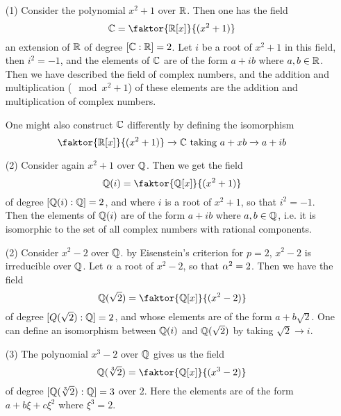 \begin{example}\label{example_8.3}
  \begin{enumerate}
    \item[(1)] Consider the polynomial $x^2+1$ over $\mathbb{R}$. Then one has the
      field
      \begin{equation*}
        \C=\faktor{\R[x]}{(x^2+1)}
      \end{equation*}
      an extension of $\mathbb{R}$ of degree $[\mathbb{C} : \mathbb{R}]=2$. Let $i$ be a root of
      $x^2+1$ in this field, then $i^2=-1$, and the elements of $\mathbb{C}$ are of
      the form $a+ib$ where  $a,b \in \mathbb{R}$. Then we have described the
      field of complex numbers, and the addition and multiplication
      ($\mod{x^2+1}$) of these elements are the addition and
      multiplication of complex numbers.

      One might also construct $\mathbb{C}$ differently by defining the
      isomorphism
      \begin{equation*}
        \faktor{\R[x]}{(x^2+1)} \xrightarrow{} \C \text{ taking }
        a+xb    \xrightarrow{} a+ib
      \end{equation*}

    \item[(2)] Consider again $x^2+1$ over  $\mathbb{Q}$. Then we get the field
      \begin{equation*}
        \Q(i)=\faktor{\Q[x]}{(x^2+1)}
      \end{equation*}
      of degree $[\mathbb{Q}(i):\mathbb{Q}]=2$, and where $i$ is a root of  $x^2+1$, so
      that  $i^2=-1$. Then the elements of  $\mathbb{Q}(i)$ are of the form $a+ib$
      where  $a,b \in \mathbb{Q}$, i.e. it is isomorphic to the set of all complex
      numbers with rational components.

    \item[(2)] Consider $x^2-2$ over  $\mathbb{Q}$. by Eisenstein's criterion for
      $p=2$,  $x^2-2$ is irreducible over  $\mathbb{Q}$. Let $\alpha$ a root of
      $x^2-2$, so that  $\alpha^2=2$. Then we have the field
      \begin{equation*}
        \Q(\sqrt{2})=\faktor{\Q[x]}{(x^2-2)}
      \end{equation*}
      of degree $[Q(\sqrt{2}) : \mathbb{Q}]=2$, and whose elements are of the form
      $a+b\sqrt{2}$. One can define an isomorphism between $\mathbb{Q}(i)$ and
      $\mathbb{Q}(\sqrt{2})$ by taking $\sqrt{2} \xrightarrow{} i$.

    \item[(3)] The polynomial $x^3-2$ over  $\mathbb{Q}$ gives us the field
      \begin{equation*}
        \Q(\sqrt[3]{2})=\faktor{\Q[x]}{(x^3-2)}
      \end{equation*}
      of degree $[\mathbb{Q}(\sqrt[3]{2}) : \mathbb{Q}]=3$ over $2$. Here the elements are
      of the form $a+b\xi+c\xi^2$ where $\xi^3=2$.


\end{enumerate}
\end{example}
